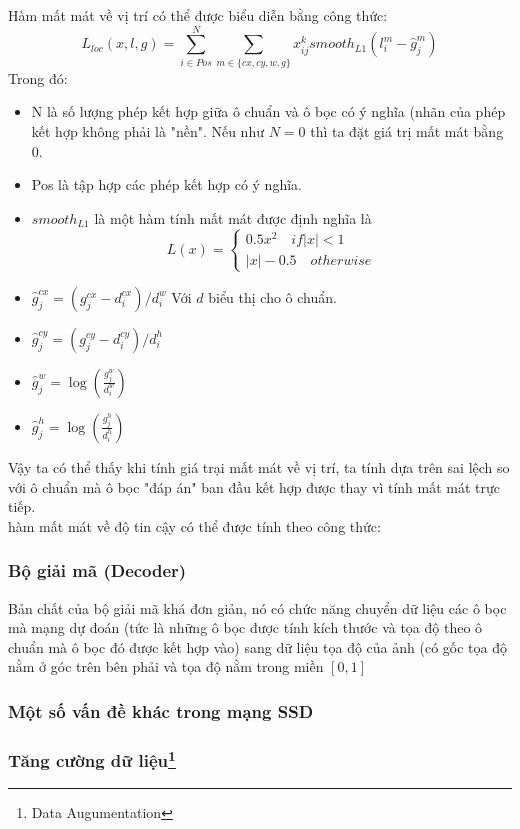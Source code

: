 \documentclass[a4paper,12pt]{article}
\begin{document}
	Hàm mất mát về vị trí có thể được biểu diễn bằng công thức:
	$$L_{loc}(x,l,g) = \sum^N_{i \in Pos} \sum_{m \in \{ cx, cy, w, g \}} x^k_{ij} smooth_{L1} (l^m_i - \hat{g}^m_j) $$
	Trong đó:
	\begin{itemize}
		\item N là số lượng phép kết hợp giữa ô chuẩn và ô bọc có ý nghĩa (nhãn của phép kết hợp không phải là "nền". Nếu như $N = 0$ thì ta đặt giá trị mất mát bằng 0.
		\item Pos là tập hợp các phép kết hợp có ý nghĩa.
		\item $smooth_{L1}$ là một hàm tính mất mát được định nghĩa là 
		$$L(x) = \begin{cases} 0.5x^2 \quad if |x| < 1 \\ |x| - 0.5 \quad otherwise \end{cases} $$
		\item $\hat{g}_j^{cx} = (g_j^{cx} - d_i^{cx}) / d^w_i$ Với $d$ biểu thị cho ô chuẩn.
		\item $\hat{g}_j^{cy} = (g_j^{cy} - d_i^{cy}) / d^h_i$
		\item $\hat{g}^w_j = \log \left( \frac{g_j^w}{d_i^w} \right)$
		\item $\hat{g}^h_j = \log \left( \frac{g_j^h}{d_i^h} \right)$
	\end{itemize}
	
	Vậy ta có thể thấy khi tính giá trại mất mát về vị trí, ta tính dựa trên sai lệch so với ô chuẩn mà ô bọc "đáp án" ban đầu kết hợp được thay vì tính mất mát trực tiếp.\\
	
	hàm mất mát về độ tin cậy có thể được tính theo công thức:
	
	\subsubsection{Bộ giải mã (Decoder)}
	
	Bản chất của bộ giải mã khá đơn giản, nó có chức năng chuyển dữ liệu các ô bọc mà mạng dự đoán (tức là những ô bọc được tính kích thước và tọa độ theo ô chuẩn mà ô bọc đó được kết hợp vào) sang dữ liệu tọa độ của ảnh (có gốc tọa độ nằm ở góc trên bên phải và tọa độ nằm trong miền $[0, 1]$
	
	\subsubsection{Một số vấn đề khác trong mạng SSD}
	\subsubsection*{Tăng cường dữ liệu\footnote{Data Augumentation}}
	
\end{document}
